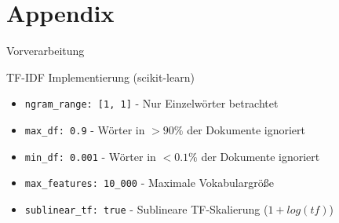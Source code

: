 \section{Appendix}

\begin{frame}{Vorverarbeitung}
    \begin{block}{TF-IDF Implementierung (scikit-learn)}
        \begin{itemize}
            \item \texttt{ngram\_range: [1, 1]} - Nur Einzelwörter betrachtet
            \item \texttt{max\_df: 0.9} - Wörter in $>90\%$ der Dokumente ignoriert
            \item \texttt{min\_df: 0.001} - Wörter in $<0.1\%$ der Dokumente ignoriert
            \item \texttt{max\_features: 10\_000} - Maximale Vokabulargröße
            \item \texttt{sublinear\_tf: true} - Sublineare TF-Skalierung ($1+log(tf)$)
        \end{itemize}
    \end{block}
\end{frame}
